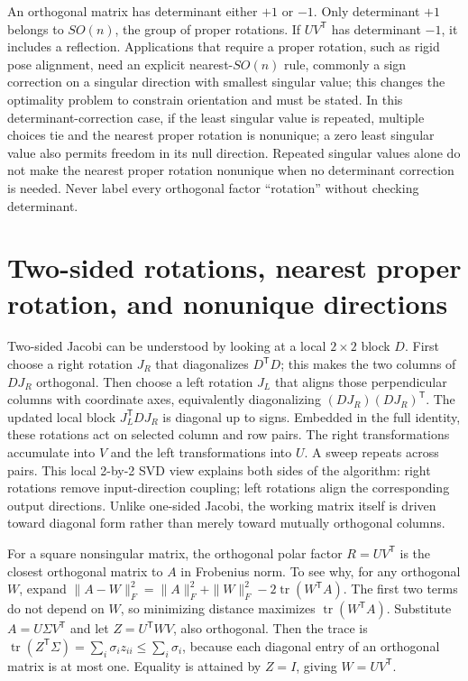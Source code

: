An orthogonal matrix has determinant either \(+1\) or \(-1\). Only determinant \(+1\) belongs to \(SO(n)\), the group of proper rotations. If \(UV^\mathsf T\) has determinant \(-1\), it includes a reflection. Applications that require a proper rotation, such as rigid pose alignment, need an explicit nearest-\(SO(n)\) rule, commonly a sign correction on a singular direction with smallest singular value; this changes the optimality problem to constrain orientation and must be stated. In this determinant-correction case, if the least singular value is repeated, multiple choices tie and the nearest proper rotation is nonunique; a zero least singular value also permits freedom in its null direction. Repeated singular values alone do not make the nearest proper rotation nonunique when no determinant correction is needed. Never label every orthogonal factor ``rotation'' without checking determinant.

\section{Two-sided rotations, nearest proper rotation, and nonunique directions}\label{02-foundations-ii-ch024-two-sided-rotations-nearest-proper-rotation-and-nonunique-directions}

Two-sided Jacobi can be understood by looking at a local \(2\times2\) block \(D\). First choose a right rotation \(J_R\) that diagonalizes \(D^\mathsf TD\); this makes the two columns of \(DJ_R\) orthogonal. Then choose a left rotation \(J_L\) that aligns those perpendicular columns with coordinate axes, equivalently diagonalizing \((DJ_R)(DJ_R)^\mathsf T\). The updated local block \(J_L^\mathsf TDJ_R\) is diagonal up to signs. Embedded in the full identity, these rotations act on selected column and row pairs. The right transformations accumulate into \(V\) and the left transformations into \(U\). A sweep repeats across pairs. This local 2-by-2 SVD view explains both sides of the algorithm: right rotations remove input-direction coupling; left rotations align the corresponding output directions. Unlike one-sided Jacobi, the working matrix itself is driven toward diagonal form rather than merely toward mutually orthogonal columns.

For a square nonsingular matrix, the orthogonal polar factor \(R=UV^\mathsf T\) is the closest orthogonal matrix to \(A\) in Frobenius norm. To see why, for any orthogonal \(W\), expand \(\|A-W\|_F^2=\|A\|_F^2+\|W\|_F^2-2\operatorname{tr}(W^\mathsf TA)\). The first two terms do not depend on \(W\), so minimizing distance maximizes \(\operatorname{tr}(W^\mathsf TA)\). Substitute \(A=U\Sigma V^\mathsf T\) and let \(Z=U^\mathsf TWV\), also orthogonal. Then the trace is \(\operatorname{tr}(Z^\mathsf T\Sigma)=\sum_i\sigma_i z_{ii}\le\sum_i\sigma_i\), because each diagonal entry of an orthogonal matrix is at most one. Equality is attained by \(Z=I\), giving \(W=UV^\mathsf T\).

